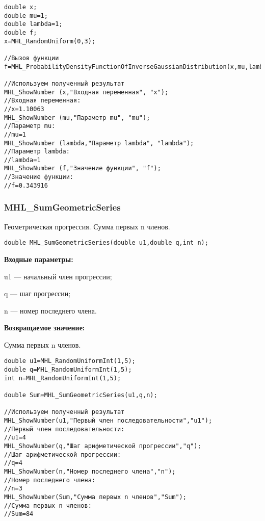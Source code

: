 \documentclass[a4paper,12pt]{article}
\begin{document}
\begin{lstlisting}[label=code_use_MHL_ProbabilityDensityFunctionOfInverseGaussianDistribution,caption=Пример использования]
double x;
double mu=1;
double lambda=1;
double f;
x=MHL_RandomUniform(0,3);

//Вызов функции
f=MHL_ProbabilityDensityFunctionOfInverseGaussianDistribution(x,mu,lambda);

//Используем полученный результат
MHL_ShowNumber (x,"Входная переменная", "x");
//Входная переменная:
//x=1.10063
MHL_ShowNumber (mu,"Параметр mu", "mu");
//Параметр mu:
//mu=1
MHL_ShowNumber (lambda,"Параметр lambda", "lambda");
//Параметр lambda:
//lambda=1
MHL_ShowNumber (f,"Значение функции", "f");
//Значение функции:
//f=0.343916
\end{lstlisting}

\subsubsection{MHL\_SumGeometricSeries}\label{MHL_SumGeometricSeries}

Геометрическая прогрессия. Сумма первых n членов.


\begin{lstlisting}[label=code_syntax_MHL_SumGeometricSeries,caption=Синтаксис]
double MHL_SumGeometricSeries(double u1,double q,int n);
\end{lstlisting}

\textbf{Входные параметры:}  
 
u1 --- начальный член прогрессии;
 
q --- шаг  прогрессии;
 
n --- номер последнего члена.

\textbf{Возвращаемое значение:}
 
Сумма первых n членов.


\begin{lstlisting}[label=code_use_MHL_SumGeometricSeries,caption=Пример использования]
double u1=MHL_RandomUniformInt(1,5);
double q=MHL_RandomUniformInt(1,5);
int n=MHL_RandomUniformInt(1,5);

double Sum=MHL_SumGeometricSeries(u1,q,n);

//Используем полученный результат
MHL_ShowNumber(u1,"Первый член последовательности","u1");
//Первый член последовательности:
//u1=4
MHL_ShowNumber(q,"Шаг арифметической прогрессии","q");
//Шаг арифметической прогрессии:
//q=4
MHL_ShowNumber(n,"Номер последнего члена","n");
//Номер последнего члена:
//n=3
MHL_ShowNumber(Sum,"Сумма первых n членов","Sum");
//Сумма первых n членов:
//Sum=84
\end{lstlisting}
\end{document}
